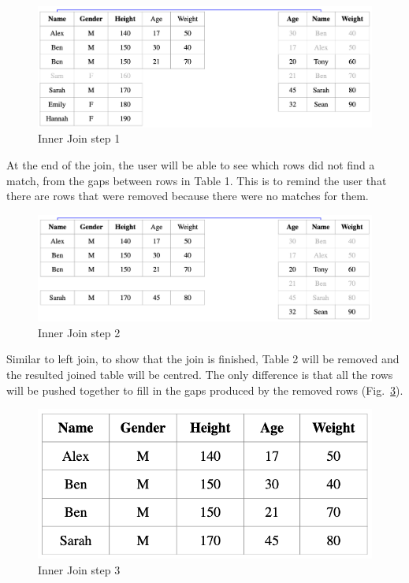 \begin{figure}[H]
    \includegraphics[scale = 0.25]{Masters-Thesis/img/inner1.png}
    \caption{Inner Join step 1}
    \label{fig:inner1}
\end{figure}

At the end of the join, the user will be able to see which rows did not find a match, from the gaps between rows in Table 1. This is to remind the user that there are rows that were removed because there were no matches for them.

\begin{figure}[H]
    \includegraphics[scale = 0.25]{Masters-Thesis/img/inner2.png}
    \caption{Inner Join step 2}
    \label{fig:inner2}
\end{figure}

Similar to left join, to show that the join is finished, Table 2 will be removed and the resulted joined table will be centred. The only difference is that all the rows will be pushed together to fill in the gaps produced by the removed rows (Fig.~\ref{fig:inner3}).

\begin{figure}[H]
    \centering
    \includegraphics[scale = 0.3]{Masters-Thesis/img/inner3.png}
    \caption{Inner Join step 3}
    \label{fig:inner3}
\end{figure}

